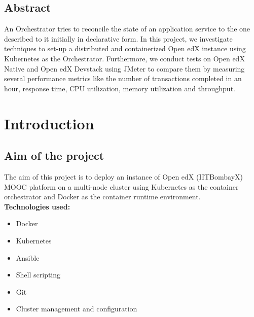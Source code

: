 \documentclass[12pt]{report}
\begin{document}
	\section*{Abstract}
	An Orchestrator tries to reconcile the state of an application service to the one described to it initially in declarative form.
	In this project, we investigate techniques to set-up a distributed and containerized Open edX instance using Kubernetes as the Orchestrator. Furthermore, we conduct tests on Open edX Native and Open edX Devstack using JMeter to compare them by measuring several performance metrics like the number of transactions completed in an hour, response time, CPU utilization, memory utilization and throughput.
	
	
	\listoffigures
	
	\pagebreak
	
	
	\tableofcontents
	
	\pagebreak
	
	\setcounter{page}{1}

\pagebreak
\chapter{Introduction}
\section{Aim of the project}

The aim of this project is to deploy an instance of Open edX (IITBombayX) MOOC platform on a multi-node cluster using Kubernetes as the container orchestrator and Docker as the container runtime environment. \\

\textbf{Technologies used:}
\begin{itemize}
	\item Docker
	\item Kubernetes
	\item Ansible
	\item Shell scripting
	\item Git
	\item Cluster management and configuration
\end{itemize}


\end{document}
